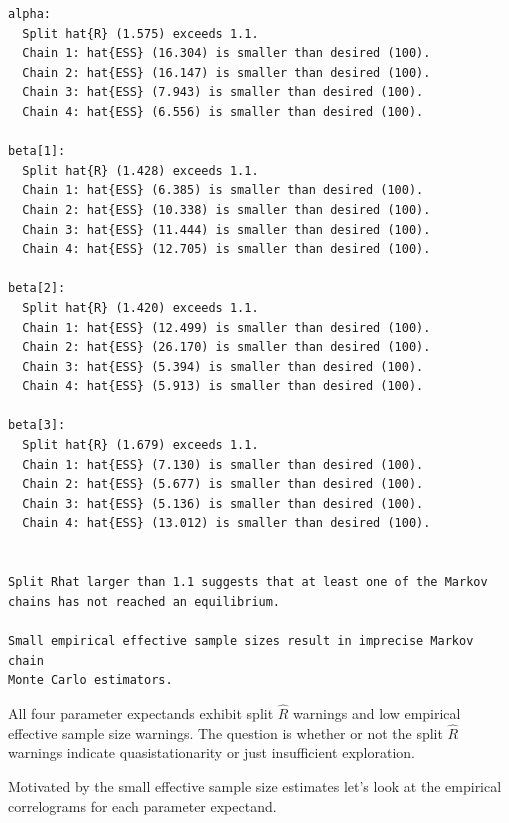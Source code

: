 \documentclass[
  letterpaper,
  DIV=11,
  numbers=noendperiod]{scrartcl}
\begin{document}
\begin{verbatim}
alpha:
  Split hat{R} (1.575) exceeds 1.1.
  Chain 1: hat{ESS} (16.304) is smaller than desired (100).
  Chain 2: hat{ESS} (16.147) is smaller than desired (100).
  Chain 3: hat{ESS} (7.943) is smaller than desired (100).
  Chain 4: hat{ESS} (6.556) is smaller than desired (100).

beta[1]:
  Split hat{R} (1.428) exceeds 1.1.
  Chain 1: hat{ESS} (6.385) is smaller than desired (100).
  Chain 2: hat{ESS} (10.338) is smaller than desired (100).
  Chain 3: hat{ESS} (11.444) is smaller than desired (100).
  Chain 4: hat{ESS} (12.705) is smaller than desired (100).

beta[2]:
  Split hat{R} (1.420) exceeds 1.1.
  Chain 1: hat{ESS} (12.499) is smaller than desired (100).
  Chain 2: hat{ESS} (26.170) is smaller than desired (100).
  Chain 3: hat{ESS} (5.394) is smaller than desired (100).
  Chain 4: hat{ESS} (5.913) is smaller than desired (100).

beta[3]:
  Split hat{R} (1.679) exceeds 1.1.
  Chain 1: hat{ESS} (7.130) is smaller than desired (100).
  Chain 2: hat{ESS} (5.677) is smaller than desired (100).
  Chain 3: hat{ESS} (5.136) is smaller than desired (100).
  Chain 4: hat{ESS} (13.012) is smaller than desired (100).


Split Rhat larger than 1.1 suggests that at least one of the Markov
chains has not reached an equilibrium.

Small empirical effective sample sizes result in imprecise Markov chain
Monte Carlo estimators.
\end{verbatim}

All four parameter expectands exhibit split \(\hat{R}\) warnings and low
empirical effective sample size warnings. The question is whether or not
the split \(\hat{R}\) warnings indicate quasistationarity or just
insufficient exploration.

Motivated by the small effective sample size estimates let's look at the
empirical correlograms for each parameter expectand.
\end{document}
